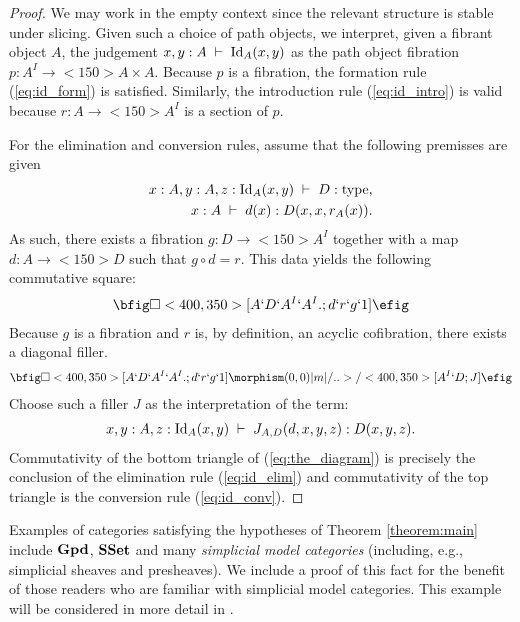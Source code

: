 \documentclass{amsart}
\newcommand{\judge}[2]{#1\;\vdash\;#2}
\newcommand{\groupoids}{\textnormal{\textbf{Gpd}}}
\newcommand{\ssets}{\textnormal{\textbf{SSet}}}
\newcommand{\id}[1]{\textnormal{Id}_{#1}}
\newcommand{\type}{\operatorname{type}}
\theoremstyle{definition}
\theoremstyle{remark}
\begin{document}
\begin{proof}
  We may work in the empty context since the relevant structure is
  stable under slicing.  Given such a choice of path objects, we
  interpret, given a fibrant object $A$, the judgement
  $\judge{x,y:A}{\id{A}(x,y)}$ as the path object fibration
  $p:A^{I}\to<150>A\times A$.  Because $p$ is a fibration,
  the formation rule (\ref{eq:id_form}) is satisfied.  Similarly, the introduction rule
  (\ref{eq:id_intro}) is valid because $r:A\to<150>A^{I}$ is a section of $p$.

  For the elimination and conversion rules, assume
  that the following premisses are given 
  \begin{align*} 
    \judge{x:A,y:A,z:\id{A}(x,y)}{D:\type&},\\
    \judge{x:A}{d(x):D(x,x,r_{A}(x))&}. 
  \end{align*} 
  As such, there exists a fibration $g:D\to<150>A^{I}$ together with a
  map $d:A\to<150>D$ such that $g\circ d=r$.  This data yields the
  following commutative square: 
  \begin{align*} 
    \bfig 
    \square<400,350>[A`D`A^{I}`A^{I}.;d`r`g`1] 
    \efig 
  \end{align*} 
  Because $g$ is a fibration and $r$ is, by definition, an acyclic
  cofibration, there exists a diagonal filler.  
  \begin{align}\label{eq:the_diagram} 
    \bfig 
    \square<400,350>[A`D`A^{I}`A^{I}.;d`r`g`1] 
    \morphism(0,0)|m|/..>/<400,350>[A^{I}`D;J] 
    \efig 
  \end{align} 
  Choose such a filler $J$ as the interpretation of the term:
  \begin{align*}
    \judge{x,y:A,z:\id{A}(x,y)}{J_{A,D}(d,x,y,z):D(x,y,z)}.
  \end{align*}
  Commutativity of the bottom triangle of (\ref{eq:the_diagram}) is
  precisely the conclusion of the elimination rule (\ref{eq:id_elim}) and commutativity
  of the top triangle is the conversion rule (\ref{eq:id_conv}). 
\end{proof}
Examples of categories satisfying the hypotheses of Theorem
\ref{theorem:main} include $\groupoids$, $\ssets$ and many
\emph{simplicial model categories} \cite{Quillen:HA} (including, e.g.,
simplicial sheaves and presheaves).  We include a proof of this fact
for the benefit of those readers who are familiar with simplicial
model categories.  This example will be considered in more detail in
\cite{Warren:PhD}.
\end{document}
